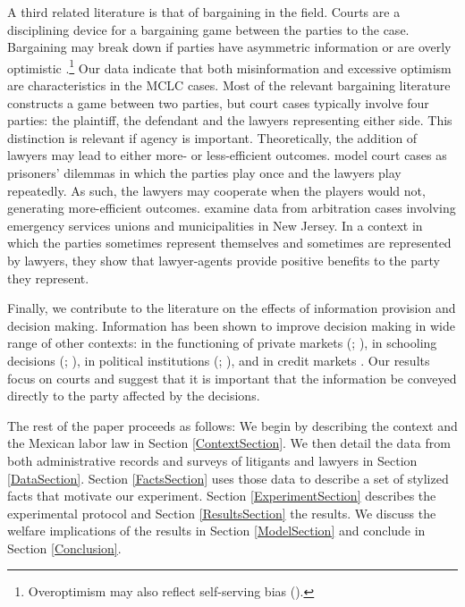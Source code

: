 \documentclass[11pt, a4paper]{article}
\begin{document}
A third related literature is that of bargaining in the field. Courts are a disciplining device for a bargaining game between the parties to the case. Bargaining may break down if parties have asymmetric information \citep{myerson} or are overly optimistic \cite{doi:10.1146/annurev-economics-061109-080334}.\footnote{Overoptimism may also reflect self-serving bias (\cite{BabcockLoewensein_BargainingImpasse}).} Our data indicate that both misinformation and excessive optimism are characteristics in the MCLC cases. Most of the relevant bargaining literature constructs a game between two parties, but court cases typically involve four parties: the plaintiff, the defendant and the lawyers representing either side. This distinction is relevant if agency is important. Theoretically, the addition of lawyers may lead to either more- or less-efficient outcomes. \cite{Gilson_columbia_law} model court cases as prisoners’ dilemmas in which the parties play once and the lawyers play repeatedly. As such, the lawyers may cooperate when the players would not, generating more-efficient outcomes. \cite{Ashenfelter_bagaining} examine data from arbitration cases involving emergency services unions and municipalities in New Jersey. In a context in which the parties sometimes represent themselves and sometimes are represented by lawyers, they show that lawyer-agents provide positive benefits to the party they represent. 

Finally, we contribute to the literature on the effects of information provision and decision making. Information has been shown to improve decision making in wide range of other contexts: in the functioning of private markets (\cite{andrabi_aer}; \cite{belot_review_economic}), in schooling decisions (\cite{jensen_qje}; \cite{dizon_aer}), in political institutions (\cite{chong_jp}; \cite{reinikka_svensson_jpe}), and in credit markets \cite{Seira}. Our results focus on courts and suggest that it is important that the information be conveyed directly to the party affected by the decisions. 

The rest of the paper proceeds as follows: We begin by describing the context and the Mexican labor law in Section \ref{ContextSection}. We then detail the data from both administrative records and surveys of litigants and lawyers in Section \ref{DataSection}. Section \ref{FactsSection} uses those data to describe a set of stylized facts that motivate our experiment. Section \ref{ExperimentSection} describes the experimental protocol and Section \ref{ResultsSection} the results. We discuss the welfare implications of the results in Section \ref{ModelSection} and conclude in Section \ref{Conclusion}.
\end{document}
